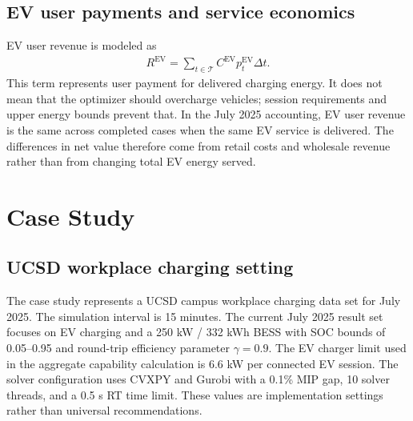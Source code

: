 \documentclass[final,5p,times]{elsarticle}
\newcommand{\DeltaT}{\Delta t}
\newcommand{\EV}{\mathrm{EV}}
\newcommand{\calT}{\mathcal{T}}
\begin{document}
\subsection{EV user payments and service economics}
EV user revenue is modeled as
\begin{align}
R^{\EV}=\sum_{t\in\calT} C^{\EV}p_t^{\EV}\DeltaT.
\label{eq:ev_revenue_main}
\end{align}
This term represents user payment for delivered charging energy. It does not mean that the optimizer should overcharge vehicles; session requirements and upper energy bounds prevent that. In the July 2025 accounting, EV user revenue is the same across completed cases when the same EV service is delivered. The differences in net value therefore come from retail costs and wholesale revenue rather than from changing total EV energy served.

\section{Case Study}
\label{sec:case_study}

\subsection{UCSD workplace charging setting}
The case study represents a UCSD campus workplace charging data set for July 2025. The simulation interval is 15 minutes. The current July 2025 result set focuses on EV charging and a 250 kW / 332 kWh BESS with SOC bounds of 0.05--0.95 and round-trip efficiency parameter $\gamma=0.9$. The EV charger limit used in the aggregate capability calculation is 6.6 kW per connected EV session. The solver configuration uses CVXPY and Gurobi with a 0.1\% MIP gap, 10 solver threads, and a 0.5 s RT time limit. These values are implementation settings rather than universal recommendations.
\end{document}
